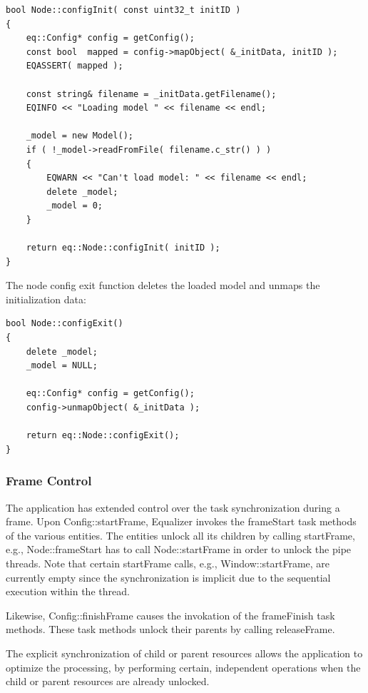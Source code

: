 \documentclass[10pt,a4]{scrartcl}
\begin{document}
{\footnotesize\begin{lstlisting}
bool Node::configInit( const uint32_t initID )
{
    eq::Config* config = getConfig();
    const bool  mapped = config->mapObject( &_initData, initID );
    EQASSERT( mapped );

    const string& filename = _initData.getFilename();
    EQINFO << "Loading model " << filename << endl;

    _model = new Model();
    if ( !_model->readFromFile( filename.c_str() ) )
    {
        EQWARN << "Can't load model: " << filename << endl;
        delete _model;
        _model = 0;
    }
    
    return eq::Node::configInit( initID );
}
\end{lstlisting}}%

The node config exit function deletes the loaded model and unmaps the
initialization data: 

{\footnotesize\begin{lstlisting}
bool Node::configExit()
{
    delete _model;
    _model = NULL;

    eq::Config* config = getConfig();
    config->unmapObject( &_initData );

    return eq::Node::configExit();
}
\end{lstlisting}}

\subsubsection{Frame Control}

The application has extended control over the task synchronization
during a frame. Upon \textsf{Config::startFrame}, Equalizer invokes the
\textsf{frameStart} task methods of the various entities. The entities
unlock all its children by calling \textsf{startFrame}, e.g.,
\textsf{Node::frameStart} has to call \textsf{Node::startFrame} in order
to unlock the pipe threads. Note that certain \textsf{startFrame} calls,
e.g., \textsf{Window::startFrame}, are currently empty since the
synchronization is implicit due to the sequential execution within the
thread.

Likewise, \textsf{Config::finishFrame} causes the invokation of the
\textsf{frameFinish} task methods. These task methods unlock their
parents by calling \textsf{releaseFrame}.

The explicit synchronization of child or parent resources allows the
application to optimize the processing, by performing certain, independent
operations when the child or parent resources are already unlocked.
\end{document}
